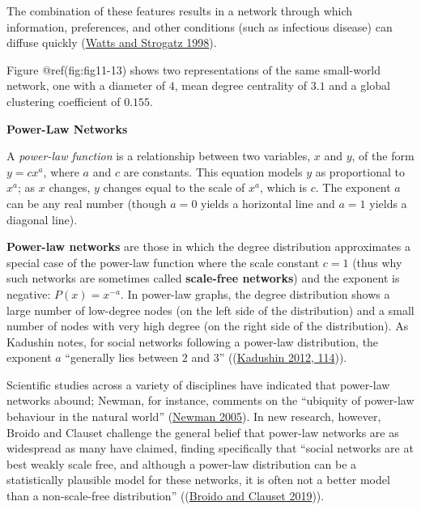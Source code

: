 \documentclass{book}
\begin{document}
The combination of these features results in a network through which
information, preferences, and other conditions (such as infectious disease)
can diffuse quickly (\protect\hyperlink{ref-WattsStrogatz1998}{Watts and
Strogatz 1998}).

Figure @ref(fig:fig11-13) shows two representations of the same small-world
network, one with a diameter of \(4\), mean degree centrality of \(3.1\) and a
global clustering coefficient of \(0.155\).

\textbf{Power-Law Networks}

A \emph{power-law function} is a relationship between two variables, \(x\) and
\(y\), of the form \(y = cx ^ a\), where \(a\) and \(c\) are constants. This
equation models \(y\) as proportional to \(x ^ a\); as \(x\) changes, \(y\)
changes equal to the scale of \(x ^ a\), which is \(c\). The exponent \(a\)
can be any real number (though \(a = 0\) yields a horizontal line and
\(a = 1\) yields a diagonal line).

\textbf{Power-law networks} are those in which the degree distribution
approximates a special case of the power-law function where the scale constant
\(c = 1\) (thus why such networks are sometimes called \textbf{scale-free
networks}) and the exponent is negative: \(P(x) = x ^ {-a}\). In power-law
graphs, the degree distribution shows a large number of low-degree nodes (on
the left side of the distribution) and a small number of nodes with very high
degree (on the right side of the distribution). As Kadushin notes, for social
networks following a power-law distribution, the exponent \(a\) ``generally
lies between \(2\) and \(3\)'' ((\protect\hyperlink{ref-Kadushin2012}{Kadushin
2012, 114})).

Scientific studies across a variety of disciplines have indicated that
power-law networks abound; Newman, for instance, comments on the ``ubiquity of
power-law behaviour in the natural world''
(\protect\hyperlink{ref-Newman2005}{Newman 2005}). In new research, however,
Broido and Clauset challenge the general belief that power-law networks are as
widespread as many have claimed, finding specifically that ``social networks
are at best weakly scale free, and although a power-law distribution can be a
statistically plausible model for these networks, it is often not a better
model than a non-scale-free distribution''
((\protect\hyperlink{ref-BroidoClauset2019}{Broido and Clauset 2019})).
\end{document}
